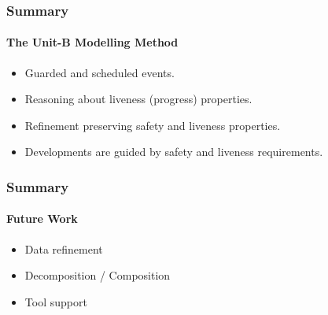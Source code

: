
\begin{frame}
  \frametitle{Summary}
  \framesubtitle{The Unit-B Modelling Method}

  \begin{itemize}
  \item Guarded and \alert{scheduled} events.
    \medskip
  \item Reasoning about \alert{liveness (progress) properties}.
    \medskip
  \item \alert{Refinement} preserving safety and liveness properties.
    \medskip
  \item Developments are \alert{guided by safety and liveness requirements}.
  \end{itemize}
\end{frame}

\begin{frame}
  \frametitle{Summary}
  \framesubtitle{Future Work}

  \begin{itemize}
  \item Data refinement
    \medskip
  \item Decomposition / Composition
    \medskip
  \item Tool support
  \end{itemize}
\end{frame}

  
    
    
    
    
